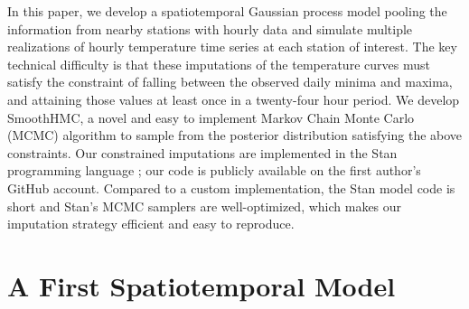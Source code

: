 \documentclass[12pt]{article}
\begin{document}
In this paper, we develop a spatiotemporal Gaussian process model pooling the information from nearby stations with hourly data and simulate multiple realizations of hourly temperature time series at each station of interest.
The key technical difficulty is that these imputations of the temperature curves must satisfy the constraint of falling between the observed daily minima and maxima, and attaining those values at least once in a twenty-four hour period.
We develop SmoothHMC, a novel and easy to implement Markov Chain Monte Carlo (MCMC) algorithm to sample from the posterior distribution satisfying the above constraints.
Our constrained imputations are implemented in the Stan programming language \citep{stancite}; our code is publicly available on the first author's GitHub account.
Compared to a custom implementation, the Stan model code is short and Stan's MCMC samplers are well-optimized, which makes our imputation strategy efficient and easy to reproduce.

\section{A First Spatiotemporal Model}\label{a-spatiotemporal-model}
\end{document}
